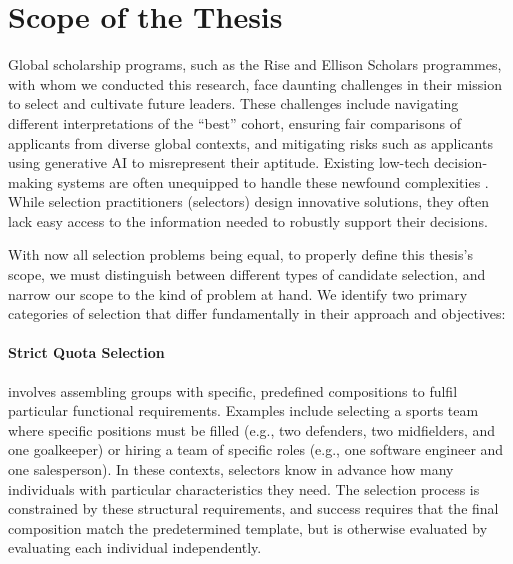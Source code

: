 \section{Scope of the Thesis}

Global scholarship programs, such as the Rise and Ellison Scholars programmes, with whom we conducted this research, face daunting challenges in their mission to select and cultivate future leaders. These challenges include navigating different interpretations of the ``best'' cohort, ensuring fair comparisons of applicants from diverse global contexts, and mitigating risks such as applicants using generative AI to misrepresent their aptitude. Existing low-tech decision-making systems are often unequipped to handle these newfound complexities \cite{Latzer_Hollnbuchner_Just_Saurwein_2014}. While selection practitioners (selectors) design innovative solutions, they often lack easy access to the information needed to robustly support their decisions.

With now all selection problems being equal, to properly define this thesis's scope, we must distinguish between different types of candidate selection, and narrow our scope to the kind of problem at hand. We identify two primary categories of selection that differ fundamentally in their approach and objectives:

\paragraph{Strict Quota Selection} involves assembling groups with specific, predefined compositions to fulfil particular functional requirements. Examples include selecting a sports team where specific positions must be filled (e.g., two defenders, two midfielders, and one goalkeeper) or hiring a team of specific roles (e.g., one software engineer and one salesperson). In these contexts, selectors know in advance how many individuals with particular characteristics they need. The selection process is constrained by these structural requirements, and success requires that the final composition match the predetermined template, but is otherwise evaluated by evaluating each individual independently.

